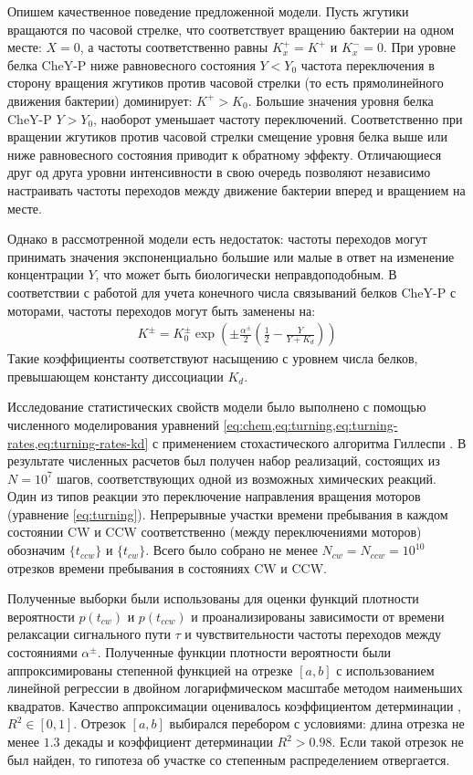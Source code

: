 Опишем качественное поведение предложенной модели. Пусть жгутики вращаются по часовой стрелке, что соответствует вращению бактерии на одном месте: $X=0$, а частоты соответственно равны $K_x^{+}=K^{+}$ и $K_x^{-}=0$. При уровне белка CheY-P ниже равновесного состояния $Y<Y_0$ частота переключения в сторону вращения жгутиков против часовой стрелки (то есть прямолинейного движения бактерии) доминирует: $K^{+}>K_0$. Большие значения уровня белка CheY-P $Y>Y_0$, наоборот уменьшает частоту переключений. Соответственно при вращении жгутиков против часовой стрелки смещение уровня белка выше или ниже равновесного состояния приводит к обратному эффекту. Отличающиеся друг од друга уровни интенсивности в свою очередь позволяют независимо настраивать частоты переходов между движение бактерии вперед и вращением на месте.

Однако в рассмотренной модели есть недостаток: частоты переходов могут принимать значения экспоненциально большие или малые в ответ на изменение концентрации $Y$, что может быть биологически неправдоподобным. В соответствии с работой \cite{frankel_adaptability_2014} для учета конечного числа связываний белков CheY-P с моторами, частоты переходов могут быть заменены на:
\begin{equation}
    \begin{aligned}
        K^{\pm}=K_0^{\pm} \exp \left (\pm\frac{\alpha^\pm}{2} \left (\frac{1}{2} - \frac{Y}{Y+K_d} \right ) \right )
    \label{eq:turning-rates-kd}
    \end{aligned}
\end{equation}
Такие коэффициенты соответствуют насыщению с уровнем числа белков, превышающем константу диссоциации $K_d$.

Исследование статистических свойств модели было выполнено с помощью численного моделирования уравнений \cref{eq:chem,eq:turning,eq:turning-rates,eq:turning-rates-kd} с применением стохастического алгоритма Гиллеспи \cite{gillespie_stochastic_2007}. В результате численных расчетов был получен набор реализаций, состоящих из $N=10^7$ шагов, соответствующих одной из возможных химических реакций. Один из типов реакции это переключение направления вращения моторов (уравнение \cref{eq:turning}). Непрерывные участки времени пребывания в каждом состоянии CW и CCW соответственно (между переключениями моторов) обозначим $\{t_{ccw}\}$ и $\{t_{cw}\}$. Всего было собрано не менее $N_{cw} = N_{ccw} = 10^{10}$ отрезков времени пребывания в состояниях CW и CCW.

Полученные выборки были использованы для оценки функций плотности вероятности $p(t_{cw})$ и $p(t_{ccw})$ и проанализированы зависимости от времени релаксации сигнального пути $\tau$ и чувствительности частоты переходов между состояниями $\alpha^{\pm}$. Полученные функции плотности вероятности были аппроксимированы степенной функцией на отрезке $[a, b]$ с использованием линейной регрессии в двойном логарифмическом масштабе методом наименьших квадратов. Качество аппроксимации оценивалось коэффициентом детерминации \cite{magnus_2021}, $R^2 \in [0, 1]$. Отрезок $[a, b]$ выбирался перебором с условиями: длина отрезка не менее $1.3$ декады и коэффициент детерминации $R^2 > 0.98$. Если такой отрезок не был найден, то гипотеза об участке со степенным распределением отвергается. 

